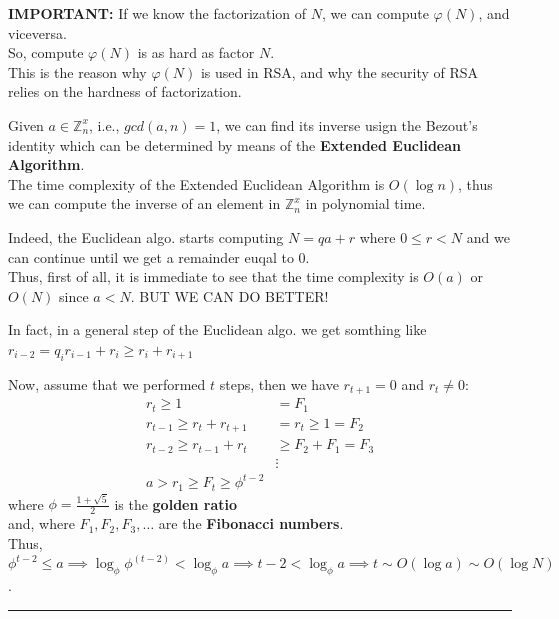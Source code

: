 \noindent
\textbf{IMPORTANT:} If we know the factorization of $N$, we can compute $\varphi(N)$, and viceversa.\\
\noindent 
So, compute $\varphi(N)$ is as hard as factor $N$.\\
This is the reason why $\varphi(N)$ is used in RSA, and why the security of RSA relies on the hardness of factorization.\\
\bigskip

\noindent
Given $a \in \mathbb{Z}^x_n$, i.e., $gcd(a,n) = 1$, we can find its inverse usign the Bezout's identity which can be determined by means of the \textbf{Extended Euclidean Algorithm}.\\
The time complexity of the Extended Euclidean Algorithm is $O(\log n)$, thus we can compute the inverse of an element in $\mathbb{Z}^x_n$ in polynomial time.
\medskip

\noindent
Indeed, the Euclidean algo. starts computing $N= qa+r$ where $0 \leq r < N$ and we can continue until we get a remainder euqal to 0.\\
Thus, first of all, it is immediate to see that the time complexity is $O(a)$ or $O(N)$ since $a<N$. BUT WE CAN DO BETTER!
\medskip

\noindent
In fact, in a general step of the Euclidean algo. we get somthing like\\
$r_{i-2} = q_i r_{i-1} + r_i \geq r_i + r_{i+1}$ 
\smallskip

\noindent
Now, assume that we performed $t$ steps, then we have $r_{t+1}=0$ and $r_t \neq 0$:
\begin{align*}
    r_t \geq 1 &= F_1 \\
    r_{t-1} \geq r_t + r_{t+1} &= r_t \geq 1= F_2\\
    r_{t-2} \geq r_{t-1} + r_t &\geq F_2+F_1=F_3\\
    &\vdots \\
    a > r_1 \geq F_t \geq \phi^{t-2}
\end{align*}
where $\phi = \frac{1+\sqrt{5}}{2}$ is the \textbf{golden ratio}\\
and, where $F_1, F_2, F_3, \dots$ are the \textbf{Fibonacci numbers}.\\
Thus, $\phi^{t-2} \leq a \implies \log_\phi \phi^(t-2) < \log_\phi a \implies t-2 < \log_\phi a \implies t \sim O(\log a) \sim O(\log N)$.

\vspace{0.5 cm}

\noindent\rule{\textwidth}{0.5pt}

